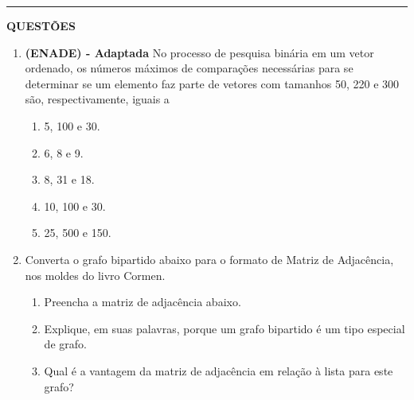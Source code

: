 \documentclass[12pt,a4paper]{article}
\begin{document}
\begin{center}
    \rule{\textwidth}{0.4pt}
    \textbf{QUESTÕES}
\end{center}

\vspace{0.5cm} 
\begin{enumerate}
    \item \textbf{(ENADE) - Adaptada} No processo de pesquisa binária em um vetor ordenado, os números máximos de comparações necessárias para se determinar se um elemento faz parte de vetores com tamanhos 50, 220 e 300 são, respectivamente, iguais a

\begin{enumerate}[label=(\Alph*)]
    \item 5, 100 e 30.
    \item 6, 8 e 9.
    \item 8, 31 e 18.
    \item 10, 100 e 30.
    \item 25, 500 e 150.
\end{enumerate}
     
    
    \item Converta o grafo bipartido abaixo para o formato de Matriz de Adjacência, nos moldes do livro Cormen.

\begin{center}
\end{center}

\begin{enumerate}[label=\alph*)]
    \item Preencha a matriz de adjacência abaixo.
    \item Explique, em suas palavras, porque um grafo bipartido é um tipo especial de grafo.
    \item Qual é a vantagem da matriz de adjacência em relação à lista para este grafo?
\end{enumerate}


\end{enumerate}
\end{document}
